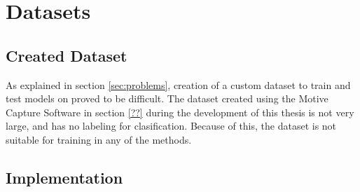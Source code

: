 \documentclass[../main.tex]{subfiles}
\begin{document}




\section{Datasets}
\subsection{Created Dataset}

As explained in section \ref{sec:problems}, creation of a custom dataset to train and test models on proved to be difficult.
The dataset created using the Motive Capture Software in section \ref{??} during the development of this thesis is not very large, and has no labeling for clasification.
Because of this, the dataset is not suitable for training in any of the methods.


\subsection{Implementation}
\end{document}
